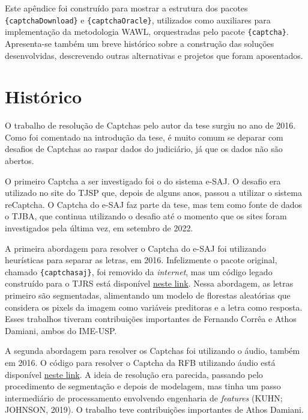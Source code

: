 \documentclass[12pt,twoside,brazilian]{book}
\begin{document}
Este apêndice foi construído para mostrar a estrutura dos pacotes
\texttt{\{captchaDownload\}} e \texttt{\{captchaOracle\}}, utilizados
como auxiliares para implementação da metodologia WAWL, orquestradas
pelo pacote \texttt{\{captcha\}}. Apresenta-se também um breve histórico
sobre a construção das soluções desenvolvidas, descrevendo outras
alternativas e projetos que foram aposentados.

\hypertarget{sec-historico}{%
\section{Histórico}\label{sec-historico}}

O trabalho de resolução de Captchas pelo autor da tese surgiu no ano de
2016. Como foi comentado na introdução da tese, é muito comum se deparar
com desafios de Captchas ao raspar dados do judiciário, já que os dados
não são abertos.

O primeiro Captcha a ser investigado foi o do sistema e-SAJ. O desafio
era utilizado no site do TJSP que, depois de alguns anos, passou a
utilizar o sistema reCaptcha. O Captcha do e-SAJ faz parte da tese, mas
tem como fonte de dados o TJBA, que continua utilizando o desafio até o
momento que os sites foram investigados pela última vez, em setembro de
2022.

A primeira abordagem para resolver o Captcha do e-SAJ foi utilizando
heurísticas para separar as letras, em 2016. Infelizmente o pacote
original, chamado \texttt{\{captchasaj\}}, foi removido da
\emph{internet}, mas um código legado construído para o TJRS está
disponível
\href{https://github.com/decryptr/captchaTJRS/blob/master/R/tools.R}{neste
link}. Nessa abordagem, as letras primeiro são segmentadas, alimentando
um modelo de florestas aleatórias que considera os pixels da imagem como
variáveis preditoras e a letra como resposta. Esses trabalhos tiveram
contribuições importantes de Fernando Corrêa e Athos Damiani, ambos do
IME-USP.

A segunda abordagem para resolver os Captchas foi utilizando o áudio,
também em 2016. O código para resolver o Captcha da RFB utilizando áudio
está disponível
\href{https://github.com/decryptr/captchaReceitaAudio}{neste link}. A
ideia de resolução era parecida, passando pelo procedimento de
segmentação e depois de modelagem, mas tinha um passo intermediário de
processamento envolvendo engenharia de \emph{features} (KUHN; JOHNSON,
2019). O trabalho teve contribuições importantes de Athos Damiani.
\end{document}
